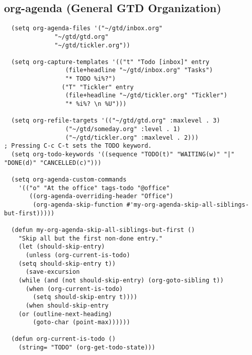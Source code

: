 \subsection{org-agenda (General GTD Organization)}
\label{sec:orgb9c1346}
\begin{verbatim}
  (setq org-agenda-files '("~/gtd/inbox.org"
			  "~/gtd/gtd.org"
			  "~/gtd/tickler.org"))

  (setq org-capture-templates '(("t" "Todo [inbox]" entry
				 (file+headline "~/gtd/inbox.org" "Tasks")
				 "* TODO %i%?")
				("T" "Tickler" entry
				 (file+headline "~/gtd/tickler.org" "Tickler")
				 "* %i%? \n %U")))

  (setq org-refile-targets '(("~/gtd/gtd.org" :maxlevel . 3)
			     ("~/gtd/someday.org" :level . 1)
			     ("~/gtd/tickler.org" :maxlevel . 2)))
; Pressing C-c C-t sets the TODO keyword.
  (setq org-todo-keywords '((sequence "TODO(t)" "WAITING(w)" "|" "DONE(d)" "CANCELLED(c)")))

  (setq org-agenda-custom-commands 
	'(("o" "At the office" tags-todo "@office"
	   ((org-agenda-overriding-header "Office")
	    (org-agenda-skip-function #'my-org-agenda-skip-all-siblings-but-first)))))

  (defun my-org-agenda-skip-all-siblings-but-first ()
    "Skip all but the first non-done entry."
    (let (should-skip-entry)
      (unless (org-current-is-todo)
	(setq should-skip-entry t))
      (save-excursion
	(while (and (not should-skip-entry) (org-goto-sibling t))
	  (when (org-current-is-todo)
	    (setq should-skip-entry t))))
      (when should-skip-entry
	(or (outline-next-heading)
	    (goto-char (point-max))))))

  (defun org-current-is-todo ()
    (string= "TODO" (org-get-todo-state)))
\end{verbatim}

